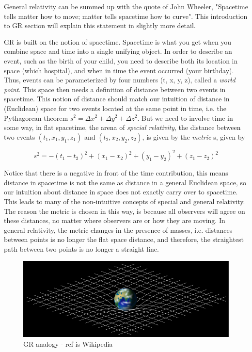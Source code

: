 \documentclass{article}
\begin{document}
General relativity can be summed up with the quote of John Wheeler, "Spacetime tells matter how to move; matter tells spacetime how to curve". This introduction to GR section will explain this statement in slightly more detail.

GR is built on the notion of spacetime. Spacetime is what you get when you combine space and time into a single unifying object. In order to describe an event, such as the birth of your child, you need to describe both its location in space (which hospital), and when in time the event occurred (your birthday). Thus, events can be parameterized by four numbers (t, x, y, z), called a \textit{world point}. This space then needs a definition of distance between two events in spacetime. This notion of distance should match our intuition of distance in (Euclidean) space for two events located at the same point in time, i.e. the Pythagorean theorem 
$s^2 = \Delta x^2 + \Delta y^2 + \Delta z^2$. But we need to involve time in some way, in flat spacetime, the arena of \textit{special relativity}, the distance between two events $(t_1,x_1,y_1,z_1)$ and $(t_2,x_2,y_2,z_2)$, is given by the \textit{metric} s, given by 

\begin{equation}\label{eq:Flat spacetime metric}
    s^2 = - (t_1-t_2)^2 + (x_1-x_2)^2 + (y_1-y_2)^2 + (z_1-z_2)^2
\end{equation}

Notice that there is a negative in front of the time contribution, this means distance in spacetime is not the same as distance in a general Euclidean space, so our intuition about distance in space does not exactly carry over to spacetime. This leads to many of the non-intuitive concepts of special and general relativity. The reason the metric is chosen in this way, is because all observers will agree on these distances, no matter where observers are or how they are moving. In general relativity, the metric changes in the presence of masses, i.e. distances between points is no longer the flat space distance, and therefore, the straightest path between two points is no longer a straight line.


\begin{figure}
    \centering
    \includegraphics[width=\textwidth]{images/640px-Spacetime_lattice_analogy.svg.png}
    \caption{GR analogy - ref is Wikipedia}
    \label{fig:GR_analogy}
\end{figure}
\end{document}
